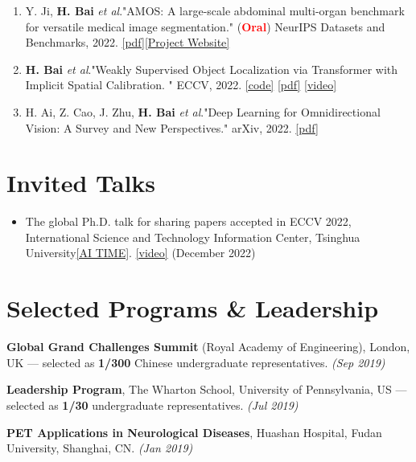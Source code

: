 \documentclass[letterpaper,10.8pt]{article}
\newcommand{\etal}{\textit{et al}.}
\begin{document}
\begin{enumerate}
\item Y. Ji, \textbf{H. Bai} \etal "AMOS: A large-scale abdominal multi-organ benchmark for versatile medical image segmentation." (\textbf{\textcolor{red}{Oral}}) NeurIPS Datasets and Benchmarks, 2022. \href{https://arxiv.org/abs/2206.08023}{[pdf]}\href{http://www.amos.sribd.cn/}{[Project Website]}
\item \textbf{H. Bai} \etal "Weakly Supervised Object Localization via Transformer with Implicit Spatial Calibration. " ECCV, 2022. \href{https://github.com/164140757/SCM}{[code]} \href{https://arxiv.org/abs/2207.10447}{[pdf]} \href{https://www.youtube.com/watch?v=zQdUudmTPOQ}{[video]} \label{SCM}
\item H. Ai, Z. Cao, J. Zhu, \textbf{H. Bai} \etal "Deep Learning for Omnidirectional Vision: A Survey and New Perspectives." arXiv, 2022. \href{https://arxiv.org/abs/2205.10468}{[pdf]} \label{360survey}
\end{enumerate}

\section{Invited Talks}
\begin{itemize}
    \item The global Ph.D. talk for sharing papers accepted in ECCV 2022, International Science and Technology Information Center, Tsinghua University\href{https://www.aitime.cn}{[AI TIME]}. 
    \href{https://www.bilibili.com/video/BV1c44y1D769}{[video]}
    (December 2022)
\end{itemize}

\section{Selected Programs \& Leadership}
\begin{description}[font=$\bullet$]
\item {\textbf{Global Grand Challenges Summit} (Royal Academy of Engineering), London, UK --- selected as \textbf{1/300} Chinese undergraduate representatives. \textit{(Sep 2019)}}
\item {\textbf{Leadership Program}, The Wharton School, University of Pennsylvania, US --- selected as \textbf{1/30} undergraduate representatives. \textit{(Jul 2019)}}
\item {\textbf{PET Applications in Neurological Diseases}, Huashan Hospital, Fudan University, Shanghai, CN. \textit{(Jan 2019)}}
\end{description}
\end{document}
